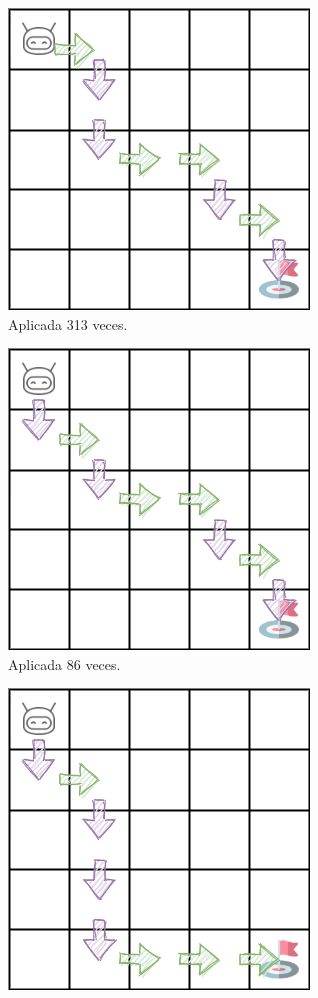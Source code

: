 \begin{figure}
    \centering
    \begin{subfigure}{.5\textwidth}
        \centering
        \includegraphics[scale=0.4]{cap5_experimentacion/images/dim5_actions_313.png}
        \caption{Aplicada 313 veces.}
        \label{fig:dim5_actions_313}
    \end{subfigure}%
    \begin{subfigure}{.5\textwidth}
        \centering
        \includegraphics[scale=0.4]{cap5_experimentacion/images/dim5_actions_86.png}
        \caption{Aplicada 86 veces.}
        \label{fig:dim5_actions_86}
    \end{subfigure}
    \begin{subfigure}{.5\textwidth}
        \centering
        \includegraphics[scale=0.4]{cap5_experimentacion/images/dim5_actions_29.png}

\end{subfigure}
\end{figure}
